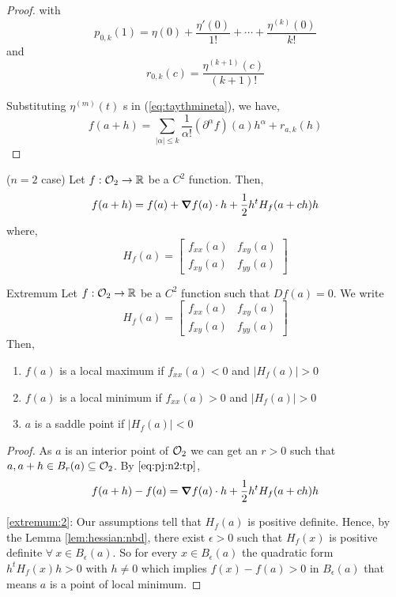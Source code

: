 \documentclass[../Analysis-3]{subfiles}
\begin{document}
\begin{proof}
    with \begin{equation}
        p_{0,k}(1) = \eta(0) + \frac{\eta '(0)}{1!} + \cdots + \frac{\eta^{(k)}(0)}{k!}
    \end{equation} and
    \begin{equation}
        r_{0,k} (c) = \frac{\eta^{(k+1)}(c)}{(k+1)!}
    \end{equation}

    Substituting $\eta^{(m)}(t)$ s in (\ref{eq:taythmineta}), we have,
    \[ f(a+h) = \sum_{| \alpha | \leq k } \frac{1}{\alpha !} ({\partial}^{\alpha} f ) (a) h^{\alpha} + r_{a,k} (h) \]
\end{proof}

\begin{noteBox}
    ($n=2$ case) Let $f : \mathcal{O}_{2} \to \mathbb{R}$ be a $C^2$ function. Then,
    \begin{equation}\label{eq:pj:n2:tp}
        f(a+h) = f(a) + \grad f(a)\cdot h + \frac{1}{2}h^t H_f(a+ch)h
    \end{equation} where,
    \[ H_f(a) = \begin{bmatrix}
            f_{xx}(a) & f_{xy}(a) \\
            f_{xy}(a) & f_{yy}(a)
        \end{bmatrix} \]
\end{noteBox}

\begin{Thm}{Extremum}{}
    Let $f : \mathcal{O}_{2} \to \mathbb{R}$ be a $C^2$ function such that $Df(a) = 0$. We write \[ H_f(a) =  \begin{bmatrix}
            f_{xx}(a) & f_{xy}(a) \\
            f_{xy}(a) & f_{yy}(a)
        \end{bmatrix} \]
    Then, \begin{enumerate}[label=(\roman*)]
        \item $f(a)$ is a local maximum if $f_{xx} (a) < 0$ and $|H_f(a)| > 0$
        \item $f(a)$ is a local minimum if $f_{xx} (a) > 0$ and $|H_f(a)| > 0$ \label{extremum:2}
        \item $a$ is a saddle point if $|H_f(a)| < 0$
    \end{enumerate}
\end{Thm}

\begin{proof}
    As $ a $ is an interior point of $ \mathcal{O}_{2} $ we can get an $ r > 0 $ such that $ a, a+h \in B_r(a) \subseteq \mathcal{O}_{2}$. By $\eqref{eq:pj:n2:tp}$, \[ f(a+h) - f(a) = \grad f(a) \cdot h + \frac{1}{2}h^t H_f(a+ch)h \]

    \ref{extremum:2}: Our assumptions tell that $H_f(a)$ is positive definite. Hence, by the Lemma \ref{lem:hessian:nbd}, there exist $ \epsilon > 0 $ such that $H_f(x)$ is positive definite $\forall\ x \in B_{\epsilon}(a)$. So for every $ x \in B_{\epsilon}(a) $ the quadratic form $ h^t H_f(x) h > 0 $ with $ h \neq 0 $ which implies $ f(x) - f(a) > 0 $ in $ B_{\epsilon}(a) $ that means $a$ is a point of local minimum.

\end{proof}
\end{document}
